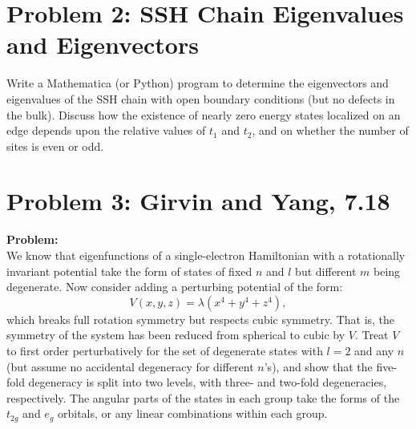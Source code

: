 \documentclass{article}
\begin{document}
\section{Problem 2: SSH Chain Eigenvalues and Eigenvectors}

Write a Mathematica (or Python) program to determine the eigenvectors and eigenvalues of the SSH chain with open boundary conditions (but no defects in the bulk). Discuss how the existence of nearly zero energy states localized on an edge depends upon the relative values of $t_1$ and $t_2$, and on whether the number of sites is even or odd.\\

\section{Problem 3: Girvin and Yang, 7.18}

\textbf{Problem:} \\
We know that eigenfunctions of a single-electron Hamiltonian with a rotationally invariant potential take the form of states of fixed $n$ and $l$ but different $m$ being degenerate. Now consider adding a perturbing potential of the form:
\[
V(x, y, z) = \lambda(x^4 + y^4 + z^4),
\]
which breaks full rotation symmetry but respects cubic symmetry. That is, the symmetry of the system has been reduced from spherical to cubic by $V$. Treat $V$ to first order perturbatively for the set of degenerate states with $l=2$ and any $n$ (but assume no accidental degeneracy for different $n$'s), and show that the five-fold degeneracy is split into two levels, with three- and two-fold degeneracies, respectively. The angular parts of the states in each group take the forms of the $t_{2g}$ and $e_g$ orbitals, or any linear combinations within each group.
\end{document}

